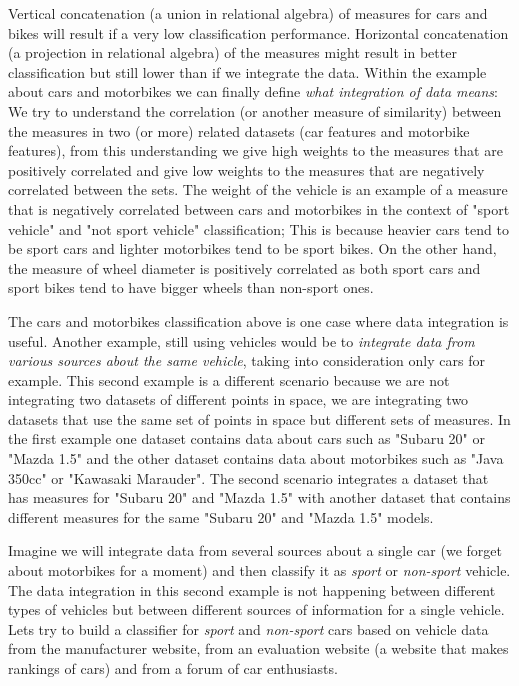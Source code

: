 \documentclass[11pt,a4paper,twoside,openright]{report}
\begin{document}
Vertical concatenation (a union in relational algebra) of measures for cars and
bikes will result if a very low classification performance.  Horizontal
concatenation (a projection in relational algebra) of the measures might result
in better classification but still lower than if we integrate the data.  Within
the example about cars and motorbikes we can finally define \emph{what
integration of data means}:  We try to understand the correlation (or another
measure of similarity) between the measures in two (or more) related datasets
(car features and motorbike features), from this understanding we give high
weights to the measures that are positively correlated and give low weights to
the measures that are negatively correlated between the sets.  The weight of
the vehicle is an example of a measure that is negatively correlated between
cars and motorbikes in the context of "sport vehicle" and "not sport vehicle"
classification;  This is because heavier cars tend to be sport cars and lighter
motorbikes tend to be sport bikes.  On the other hand, the measure of wheel
diameter is positively correlated as both sport cars and sport bikes tend to
have bigger wheels than non-sport ones.

The cars and motorbikes classification above is one case where data integration
is useful.  Another example, still using vehicles would be to \emph{integrate
data from various sources about the same vehicle}, taking into consideration
only cars for example.  This second example is a different scenario because we
are not integrating two datasets of different points in space, we are
integrating two datasets that use the same set of points in space but different
sets of measures.  In the first example one dataset contains data about cars
such as "Subaru 20" or "Mazda 1.5" and the other dataset contains data about
motorbikes such as "Java 350cc" or "Kawasaki Marauder".  The second scenario
integrates a dataset that has measures for "Subaru 20" and "Mazda 1.5" with
another dataset that contains different measures for the same "Subaru 20" and
"Mazda 1.5" models.

Imagine we will integrate data from several sources about a single car (we
forget about motorbikes for a moment) and then classify it as \emph{sport} or
\emph{non-sport} vehicle.  The data integration in this second example is not
happening between different types of vehicles but between different sources of
information for a single vehicle.  Lets try to build a classifier for
\emph{sport} and \emph{non-sport} cars based on vehicle data from the
manufacturer website, from an evaluation website (a website that makes rankings
of cars) and from a forum of car enthusiasts.
\end{document}
